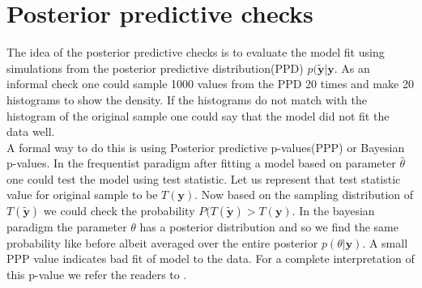 
\section{Posterior predictive checks}
\label{sec : ppc}

The idea of the posterior predictive checks is to evaluate the model fit using simulations from the posterior predictive distribution(PPD) $p(\boldsymbol{\tilde{y}}|\boldsymbol{y}$. As an informal check one could sample 1000 values from the PPD 20 times and make 20 histograms to show the density. If the histograms do not match with the histogram of the original sample one could say that the model did not fit the data well.\\ 
A formal way to do this is using Posterior predictive p-values(PPP) or Bayesian p-values. In the frequentist paradigm after fitting a model based on parameter $\hat{\theta}$ one could test the model using test statistic. Let us represent that test statistic value for original sample to be $T(\boldsymbol{y})$. Now based on the sampling distribution of $T(\boldsymbol{\tilde{y}})$ we could check the probability $P(T(\boldsymbol{\tilde{y}}) > T(\boldsymbol{y})$. In the bayesian paradigm the parameter $\theta$ has a posterior distribution and so we find the same probability like before albeit averaged over the entire posterior $p(\theta|\boldsymbol{y})$. A small PPP value indicates bad fit of model to the data. For a complete interpretation of this p-value we refer the readers to \citet{gelman_understanding_2012}.
